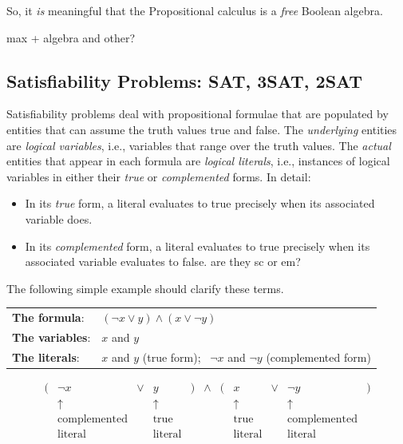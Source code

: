 So, it {\em is} meaningful that the Propositional calculus is a {\em
  free} Boolean algebra.
  
  {\Denis max + algebra and other?}


\subsection{Satisfiability Problems: {\sf SAT}, {\sf 3SAT}, {\sf 2SAT}}
\label{sec:Satisfiability}

Satisfiability problems deal with propositional formulae that are
populated by entities that can assume the truth values {\sc
  true} and {\sc false}. 
The {\em underlying} entities are {\it logical variables},
i.e., variables that range over the truth values.  The {\em actual}
entities that appear in each formula are {\it logical literals}, 
i.e., instances of logical variables in either their {\em true} or
{\em complemented} forms.
In detail:
\begin{itemize}
\item
In its {\em true} form, a literal evaluates to {\sc true}
precisely when its associated variable does.
\item
In its {\em complemented} form, a literal evaluates to {\sc
  true} precisely when its associated variable evaluates to {\sc
  false}.
  {\Denis are they sc or em?}
\end{itemize}
The following simple example should clarify these terms.

\begin{tabular}{ll}
{\bf The formula}:  & $(\neg {x} \vee y) \wedge (x \vee \neg{y})$ \\
{\bf The variables}: & $x$ and $y$ \\
{\bf The literals}:  & $x$ and $y$ (true form); \ $\neg {x}$ and $\neg {y}$
(complemented form)
\end{tabular}
\[
\begin{array}{ccccccccccc}
( & \neg {x} & \vee & y & ) & \wedge & ( & x & \vee & \neg{y} & ) \\
  & \uparrow &     & \uparrow & & & & \uparrow & & \uparrow & \\
  & \mbox{complemented} &  & \mbox{true}  & & & & \mbox{true} &
        & \mbox{complemented} &  \\
  & \mbox{literal} & & \mbox{literal} & & & & \mbox{literal} & &
  \mbox{literal} & 
\end{array}
\]

